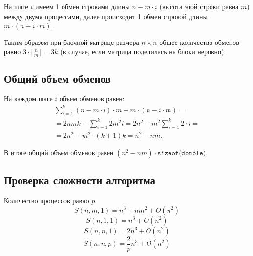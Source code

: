 \documentclass[12pt]{article} %
\begin{document}
На шаге $i$ имеем 1 обмен строками длины $n - m \cdot i$ (высота этой строки равна $m$) между двумя процессами, далее происходит 1 обмен строкой длины $m \cdot (n - i \cdot m)$.

Таким образом при блочной матрице размера $n \times n$ общее количество обменов равно $3 \cdot \lfloor \frac{n}{m} \rfloor = 3k$ (в случае, если матрица поделилась на блоки неровно).

\subsection{Общий объем обменов}
На каждом шаге $i$ объем обменов равен:
\begin{multline} \nonumber
\sum\limits_{i = 1}^{k}(n - m \cdot i) \cdot m + m \cdot (n - i \cdot m) = \\
= 2nmk - \sum\limits_{i = 1}^{k} 2m^2i = 2n^2-m^2\sum\limits_{i = 1}^{k} 2\cdot i = \\ = 2n^2 - m^2 \cdot (k + 1)k = n^2 - nm.
\end{multline}

В итоге общий объем обменов равен $(n^2-nm)\cdot \texttt{sizeof(double)}$.

\subsection{Проверка сложности алгоритма}
Количество процессов равно $p$.
$$S(n,m,1) = n^3 + nm^2 + O(n^2)$$
$$S(n,1,1) = n^3 + O(n^2)$$
$$S(n,n,1) = 2n^3 + O(n^2)$$
$$S(n,n,p) = \frac{2}{p}n^3 + O(n^2)$$
\end{document}
